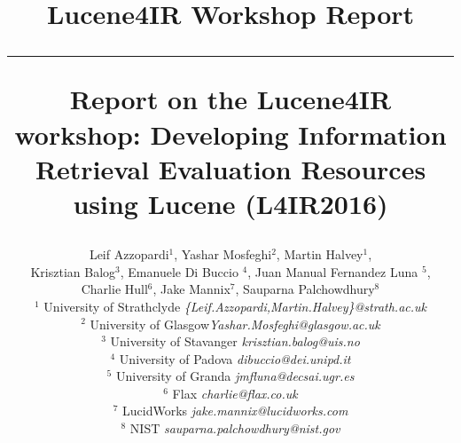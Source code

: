 \documentclass[12pt]{article}
\begin{document}
\title{\vspace{-2.5cm}
\begin{center}
\textbf{\small{Lucene4IR Workshop Report}}\\\vspace{-0.5cm} \rule{17.5cm}{1pt}
\end{center}
\vspace{1cm}\textbf{Report on the Lucene4IR workshop: Developing Information Retrieval Evaluation Resources using Lucene (L4IR2016) }}

\newcommand{\todo}[1]{\textcolor{red}{#1}}
\author{
Leif Azzopardi$^{1}$, Yashar Mosfeghi$^{2}$, Martin Halvey$^{1}$, \\
Krisztian Balog$^{3}$, Emanuele Di Buccio $^4$, Juan Manual Fernandez Luna $^{5}$,\\
 Charlie Hull$^{6}$, Jake Mannix$^{7}$, Sauparna Palchowdhury$^{8}$\\
    $^{1}$ {\small University of Strathclyde  \emph{ \{Leif.Azzopardi,Martin.Halvey\}@strath.ac.uk}}\\
    $^{2}$ {\small University of Glasgow\emph{\small Yashar.Mosfeghi@glasgow.ac.uk}}\\
	$^{3}$ {\small University of Stavanger \emph{\small krisztian.balog@uis.no}}\\
	$^{4}$ {\small University of Padova \emph{\small dibuccio@dei.unipd.it}}\\
	$^{5}$ {\small University of Granda \emph{\small jmfluna@decsai.ugr.es}}\\
	$^{6}$ {\small Flax \emph{\small charlie@flax.co.uk}}\\
	$^{7}$ {\small LucidWorks \emph{\small jake.mannix@lucidworks.com}}\\
	$^{8}$ {\small NIST \emph{\small sauparna.palchowdhury@nist.gov}}
}
\end{document}
